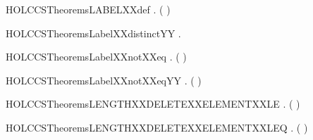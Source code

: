 \newcommand{\HOLCCSTheoremsLabelXXcaseXXeq}{\UseVerbatim{HOLCCSTheoremsLabelXXcaseXXeq}}
\begin{SaveVerbatim}{HOLCCSTheoremsLABELXXdef}
\HOLTokenTurnstile{} \HOLSymConst{\HOLTokenForall{}}.  ( ) \HOLSymConst{=} 
\end{SaveVerbatim}
\newcommand{\HOLCCSTheoremsLABELXXdef}{\UseVerbatim{HOLCCSTheoremsLABELXXdef}}
\begin{SaveVerbatim}{HOLCCSTheoremsLabelXXdistinctYY}
\HOLTokenTurnstile{} \HOLSymConst{\HOLTokenForall{}} .   \HOLSymConst{\HOLTokenNotEqual{}}  
\end{SaveVerbatim}
\newcommand{\HOLCCSTheoremsLabelXXdistinctYY}{\UseVerbatim{HOLCCSTheoremsLabelXXdistinctYY}}
\begin{SaveVerbatim}{HOLCCSTheoremsLabelXXnotXXeq}
\HOLTokenTurnstile{} \HOLSymConst{\HOLTokenForall{}} . (  \HOLSymConst{=}  ) \HOLSymConst{\HOLTokenEquiv{}} 
\end{SaveVerbatim}
\newcommand{\HOLCCSTheoremsLabelXXnotXXeq}{\UseVerbatim{HOLCCSTheoremsLabelXXnotXXeq}}
\begin{SaveVerbatim}{HOLCCSTheoremsLabelXXnotXXeqYY}
\HOLTokenTurnstile{} \HOLSymConst{\HOLTokenForall{}} . (  \HOLSymConst{=}  ) \HOLSymConst{\HOLTokenEquiv{}} 
\end{SaveVerbatim}
\newcommand{\HOLCCSTheoremsLabelXXnotXXeqYY}{\UseVerbatim{HOLCCSTheoremsLabelXXnotXXeqYY}}
\begin{SaveVerbatim}{HOLCCSTheoremsLENGTHXXDELETEXXELEMENTXXLE}
\HOLTokenTurnstile{} \HOLSymConst{\HOLTokenForall{}} .    \HOLSymConst{\HOLTokenImp{}}  (  ) \HOLSymConst{\HOLTokenLt{}}  
\end{SaveVerbatim}
\newcommand{\HOLCCSTheoremsLENGTHXXDELETEXXELEMENTXXLE}{\UseVerbatim{HOLCCSTheoremsLENGTHXXDELETEXXELEMENTXXLE}}
\begin{SaveVerbatim}{HOLCCSTheoremsLENGTHXXDELETEXXELEMENTXXLEQ}
\HOLTokenTurnstile{} \HOLSymConst{\HOLTokenForall{}} .  (  ) \HOLSymConst{\HOLTokenLeq{}}  
\end{SaveVerbatim}

